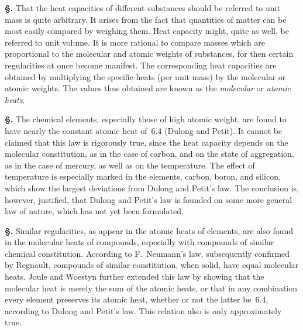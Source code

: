 \documentclass[12pt]{book}[2005/09/16]
\newcommand{\Section}[1]{
  \medskip\par\textbf{§\;#1}
  \label{section:#1}
}
\newcommand{\PageSep}[1]{\ignorespaces}
\begin{document}
\Section{48.} That the heat capacities of different substances
should be referred to unit mass is quite arbitrary. It arises
from the fact that quantities of matter can be most easily
compared by weighing them. Heat capacity might, quite
as well, be referred to unit volume. It is more rational to
compare masses which are proportional to the molecular
and atomic weights of substances, for then certain regularities
at once become manifest. The corresponding heat
capacities are obtained by multiplying the specific heats
(per unit mass) by the molecular or atomic weights. The
values thus obtained are known as the \emph{molecular} or \emph{atomic
heats}.

\Section{49.} The chemical elements, especially those of high
%
atomic weight, are found to have nearly the constant atomic
heat of~$6.4$ (Dulong and Petit). It cannot be claimed that
this law is rigorously true, since the heat capacity depends
on the molecular constitution, as in the case of carbon, and
on the state of aggregation, as in the case of mercury, as
well as on the temperature. The effect of temperature is
especially marked in the elements, carbon, boron, and
silicon, which show the largest deviations from Dulong
and Petit's law. The conclusion is, however, justified, that
Dulong and Petit's law is founded on some more general
%
law of nature, which has not yet been formulated.
\PageSep{35}

\Section{50.} Similar regularities, as appear in the atomic heats of
%
%
elements, are also found in the molecular heats of compounds,
especially with compounds of similar chemical constitution.
According to F.~Neumann's law, subsequently confirmed by
Regnault, compounds of similar constitution, when solid,
have equal molecular heats. Joule and Woestyn further
extended this law by showing that the molecular heat is
merely the sum of the atomic heats, or that in any combination
every element preserves its atomic heat, whether
or not the latter be~$6.4$, according to Dulong and Petit's
law. This relation also is only approximately true.
\end{document}
